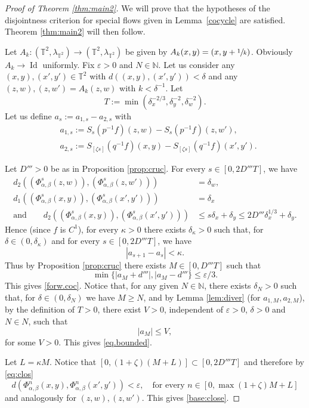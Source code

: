 \documentclass[JEP,XML,SOM,Unicode,NoEqCountersInSection]{cedram}
\let\epsilon\varepsilon
\DeclareMathOperator{\Id}{Id}
\theoremstyle{definition}
\theoremstyle{plain}
\newcommand\NN{\mathbb{N}}
\newcommand\TT{\mathbb{T}}
\begin{document}
\begin{proof}[Proof of Theorem \ref{thm:main2}] We will prove that the hypotheses of the disjointness criterion for special flows given in
Lemma~\ref{cocycle} are satisfied. Theorem \ref{thm:main2} will then follow.

Let $A_k:(\TT^2,\lambda_{\TT^2})\to (\TT^2,\lambda_{\TT^2})$ be given by $A_k(x,y)=(x,y+\sfrac{1}{k})$. Obviously $A_k\to \Id$ uniformly.
Fix $\epsilon>0$ and $N\in \NN$. Let us consider any
$(x,y),(x',y')\in \TT^2$ with $d((x,y),(x',y'))<\delta$ and any $(z,w),(z,w')=A_k(z,w)$ with $k<\delta^{-1}$. Let
\[
T:=\min(\delta_x^{-2/3},\delta_y^{-2},\delta_w^{-2}).
\]
Let us define $a_s:=a_{1,s}-a_{2,s}$ with
\[
\begin{aligned}
&a_{1,s}:=S_s(p^{-1}f)(z,w)-S_s(p^{-1}f)(z,w'), \\ & a_{2,s}:=S_{[\zeta s]}(q^{-1}f)(x,y)-S_{[\zeta s]}(q^{-1}f)(x',y').
\end{aligned}
\]

Let $D'''>0$ be as in Proposition \ref{prop:cruc}. For every $s\in [0,2D'''T]$, we have
\begin{equation}\label{eq:clos}
\begin{split}
d_2((\Phi_{\alpha,\beta}^s(z,w)),(\Phi_{\alpha,\beta}^s(z,w')))&=\delta_w, \\
d_1((\Phi_{\alpha,\beta}^s(x,y)),(\Phi_{\alpha,\beta}^s(x',y')))&=
\delta_x\\
\text{and}\qquad
d_2((\Phi_{\alpha,\beta}^s(x,y)),(\Phi_{\alpha,\beta}^s(x',y')))&\leq s\delta_x+\delta_y\leq 2D'''\delta_x^{1/3}+\delta_y.
\end{split}
\end{equation}
Hence (since $f$ is $C^1$), for every $\kappa>0$ there exists $\delta_\kappa>0$ such that, for $\delta\in (0,\delta_\kappa)$ and
for every $s\in [0,2D'''T]$, we have
\[|a_{s+1}-a_s|<\kappa.\]
Thus by Proposition \ref{prop:cruc} there exists $M\in [0,D'''T]$ such that
\[
\min\{ |a_M+d'''|, |a_M- d''' \} \leq \epsilon/3.
\]
This gives \eqref{forw.coc}.
Notice that, for any given $N\in \NN$, there exists $\delta_N>0$ such that, for $\delta \in (0,\delta_N)$ we have
$M\geq N$, and by Lemma \ref{lem:diver} (for $a_{1,M},a_{2,M}$), by the definition of $T>0$,
there exist $V>0$, independent of $\epsilon>0$, $\delta>0$ and $N\in N$, such that
\[
|a_M|\leq V,
\]
for some $V>0$. This gives \eqref{eq.bounded}.

Let $L=\kappa M$. Notice that $[0,(1+\zeta)(M+L)]\subset [0,2D'''T]$ and therefore by \eqref{eq:clos}
\begin{equation*}
d(\Phi_{\alpha,\beta}^n(x,y),\Phi_{\alpha,\beta}^n(x',y'))<\epsilon, \quad\text{for every } n\in [0,\max(1+\zeta)M+L]
\end{equation*}
and analogously for $(z,w), (z,w')$. This gives \eqref{base:close}.


\end{proof}
\end{document}

